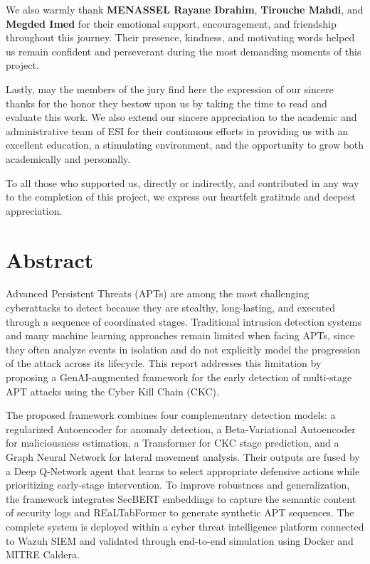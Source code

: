 \documentclass[11pt,a4paper]{report}
\begin{document}
We also warmly thank \textbf{MENASSEL Rayane Ibrahim}, \textbf{Tirouche Mahdi}, and \textbf{Megded Imed} for their emotional support, encouragement, and friendship throughout this journey. Their presence, kindness, and motivating words helped us remain confident and perseverant during the most demanding moments of this project.

Lastly, may the members of the jury find here the expression of our sincere thanks for the honor they bestow upon us by taking the time to read and evaluate this work. We also extend our sincere appreciation to the academic and administrative team of ESI for their continuous efforts in providing us with an excellent education, a stimulating environment, and the opportunity to grow both academically and personally.

To all those who supported us, directly or indirectly, and contributed in any way to the completion of this project, we express our heartfelt gratitude and deepest appreciation.
\newpage

\chapter*{Abstract}

Advanced Persistent Threats (APTs) are among the most challenging cyberattacks to detect because they are stealthy, long-lasting, and executed through a sequence of coordinated stages. Traditional intrusion detection systems and many machine learning approaches remain limited when facing APTs, since they often analyze events in isolation and do not explicitly model the progression of the attack across its lifecycle. This report addresses this limitation by proposing a GenAI-augmented framework for the early detection of multi-stage APT attacks using the Cyber Kill Chain (CKC).

The proposed framework combines four complementary detection models: a regularized Autoencoder for anomaly detection, a Beta-Variational Autoencoder for maliciousness estimation, a Transformer for CKC stage prediction, and a Graph Neural Network for lateral movement analysis. Their outputs are fused by a Deep Q-Network agent that learns to select appropriate defensive actions while prioritizing early-stage intervention. To improve robustness and generalization, the framework integrates SecBERT embeddings to capture the semantic content of security logs and REaLTabFormer to generate synthetic APT sequences. The complete system is deployed within a cyber threat intelligence platform connected to Wazuh SIEM and validated through end-to-end simulation using Docker and MITRE Caldera.
\end{document}
